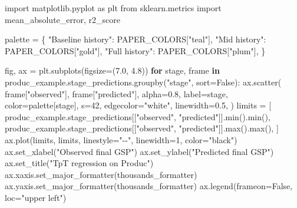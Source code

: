 \documentclass[
  letterpaper,
  DIV=11,
  numbers=noendperiod]{scrartcl}
\newenvironment{Shaded}{\begin{snugshade}}{\end{snugshade}}
\newcommand{\BuiltInTok}[1]{\textcolor[rgb]{0.00,0.23,0.31}{#1}}
\newcommand{\ControlFlowTok}[1]{\textcolor[rgb]{0.00,0.23,0.31}{\textbf{#1}}}
\newcommand{\DecValTok}[1]{\textcolor[rgb]{0.68,0.00,0.00}{#1}}
\newcommand{\FloatTok}[1]{\textcolor[rgb]{0.68,0.00,0.00}{#1}}
\newcommand{\ImportTok}[1]{\textcolor[rgb]{0.00,0.46,0.62}{#1}}
\newcommand{\KeywordTok}[1]{\textcolor[rgb]{0.00,0.23,0.31}{\textbf{#1}}}
\newcommand{\NormalTok}[1]{\textcolor[rgb]{0.00,0.23,0.31}{#1}}
\newcommand{\OperatorTok}[1]{\textcolor[rgb]{0.37,0.37,0.37}{#1}}
\newcommand{\StringTok}[1]{\textcolor[rgb]{0.13,0.47,0.30}{#1}}
\newcommand{\VariableTok}[1]{\textcolor[rgb]{0.07,0.07,0.07}{#1}}
\begin{document}
\begin{Shaded}
\begin{Highlighting}[]
\ImportTok{import}\NormalTok{ matplotlib.pyplot }\ImportTok{as}\NormalTok{ plt}
\ImportTok{from}\NormalTok{ sklearn.metrics }\ImportTok{import}\NormalTok{ mean\_absolute\_error, r2\_score}

\NormalTok{palette }\OperatorTok{=}\NormalTok{ \{}
    \StringTok{"Baseline history"}\NormalTok{: PAPER\_COLORS[}\StringTok{"teal"}\NormalTok{],}
    \StringTok{"Mid history"}\NormalTok{: PAPER\_COLORS[}\StringTok{"gold"}\NormalTok{],}
    \StringTok{"Full history"}\NormalTok{: PAPER\_COLORS[}\StringTok{"plum"}\NormalTok{],}
\NormalTok{\}}

\NormalTok{fig, ax }\OperatorTok{=}\NormalTok{ plt.subplots(figsize}\OperatorTok{=}\NormalTok{(}\FloatTok{7.0}\NormalTok{, }\FloatTok{4.8}\NormalTok{))}
\ControlFlowTok{for}\NormalTok{ stage, frame }\KeywordTok{in}\NormalTok{ produc\_example.stage\_predictions.groupby(}\StringTok{"stage"}\NormalTok{, sort}\OperatorTok{=}\VariableTok{False}\NormalTok{):}
\NormalTok{    ax.scatter(}
\NormalTok{        frame[}\StringTok{"observed"}\NormalTok{],}
\NormalTok{        frame[}\StringTok{"predicted"}\NormalTok{],}
\NormalTok{        alpha}\OperatorTok{=}\FloatTok{0.8}\NormalTok{,}
\NormalTok{        label}\OperatorTok{=}\NormalTok{stage,}
\NormalTok{        color}\OperatorTok{=}\NormalTok{palette[stage],}
\NormalTok{        s}\OperatorTok{=}\DecValTok{42}\NormalTok{,}
\NormalTok{        edgecolor}\OperatorTok{=}\StringTok{"white"}\NormalTok{,}
\NormalTok{        linewidth}\OperatorTok{=}\FloatTok{0.5}\NormalTok{,}
\NormalTok{    )}
\NormalTok{limits }\OperatorTok{=}\NormalTok{ [}
\NormalTok{    produc\_example.stage\_predictions[[}\StringTok{"observed"}\NormalTok{, }\StringTok{"predicted"}\NormalTok{]].}\BuiltInTok{min}\NormalTok{().}\BuiltInTok{min}\NormalTok{(),}
\NormalTok{    produc\_example.stage\_predictions[[}\StringTok{"observed"}\NormalTok{, }\StringTok{"predicted"}\NormalTok{]].}\BuiltInTok{max}\NormalTok{().}\BuiltInTok{max}\NormalTok{(),}
\NormalTok{]}
\NormalTok{ax.plot(limits, limits, linestyle}\OperatorTok{=}\StringTok{"{-}{-}"}\NormalTok{, linewidth}\OperatorTok{=}\DecValTok{1}\NormalTok{, color}\OperatorTok{=}\StringTok{"black"}\NormalTok{)}
\NormalTok{ax.set\_xlabel(}\StringTok{"Observed final GSP"}\NormalTok{)}
\NormalTok{ax.set\_ylabel(}\StringTok{"Predicted final GSP"}\NormalTok{)}
\NormalTok{ax.set\_title(}\StringTok{"TpT regression on Produc"}\NormalTok{)}
\NormalTok{ax.xaxis.set\_major\_formatter(thousands\_formatter)}
\NormalTok{ax.yaxis.set\_major\_formatter(thousands\_formatter)}
\NormalTok{ax.legend(frameon}\OperatorTok{=}\VariableTok{False}\NormalTok{, loc}\OperatorTok{=}\StringTok{"upper left"}\NormalTok{)}


\end{Highlighting}
\end{Shaded}
\end{document}
